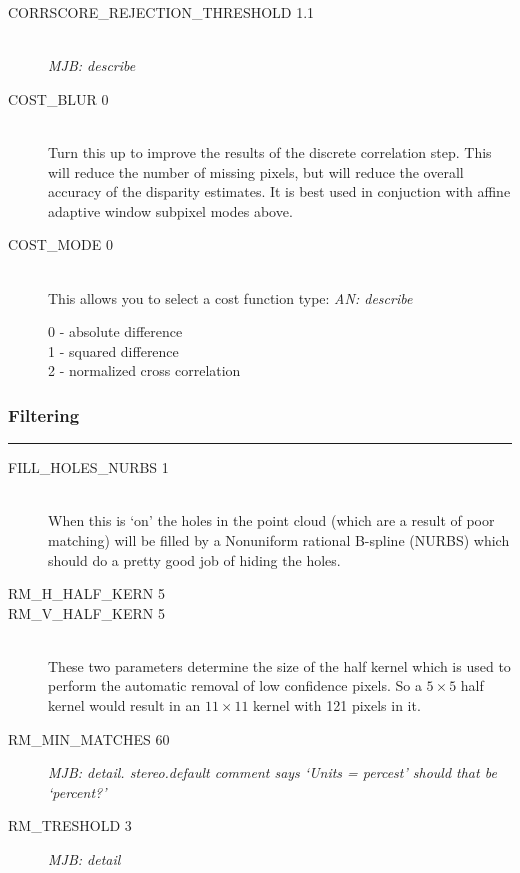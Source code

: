 \begin{description}
\item[CORRSCORE\_REJECTION\_THRESHOLD 1.1] \hfill \\
\emph{MJB: describe}

\item[COST\_BLUR 0] \hfill \\
Turn this up to improve the results of the discrete
correlation step.  This will reduce the number of 
missing pixels, but will reduce the overall accuracy of 
the disparity estimates.  It is best used in conjuction with 
affine adaptive window subpixel modes above.

\item[COST\_MODE 0] \hfill \\
This allows you to select a cost function type:
\emph{AN: describe}
	\begin{description}
	\item[0 - absolute difference]
	\item[1 - squared difference]
	\item[2 - normalized cross correlation]
	\end{description}

\end{description}

\subsubsection*{Filtering}
\hrule
\bigskip

\begin{description}

\item[FILL\_HOLES\_NURBS 1] \hfill \\
When this is `on' the holes in the point cloud (which are a result of poor matching) will be filled by a Nonuniform rational B-spline (NURBS) which should do a pretty good job of hiding the holes.

\item[RM\_H\_HALF\_KERN 5]
\item[RM\_V\_HALF\_KERN 5] \hfill \\
These two parameters determine the size of the half kernel which
is used to perform the automatic removal of low confidence pixels.
So a $5 \times 5$ half kernel would result in an $11 \times 11$
kernel with 121 pixels in it.

\item[RM\_MIN\_MATCHES 60]
\emph{MJB: detail.  stereo.default comment says `Units = percest'  should that be `percent?'}

\item[RM\_TRESHOLD 3]
\emph{MJB: detail}

\end{description}


